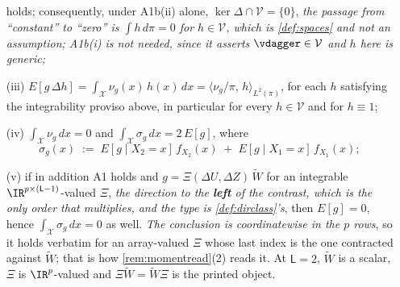 \begin{lemma}
\begin{enumerate}
holds; consequently, under A1b(ii) alone, $\ker\Delta\cap\mathcal V=\{0\}$, \emph{the passage from
``constant'' to ``zero'' is $\int h\,d\pi=0$ for $h\in\mathcal V$, which is \cref{def:spaces} and not an
assumption; A1b(i) is not needed, since it asserts $\vdagger\in\mathcal V$ and $h$ here is generic;}
\item[(iii)] $E[g\,\Delta h]=\int_{\mathcal X}\nu_g(x)\,h(x)\,dx=\langle\nu_g/\pi,\,h\rangle_{L^{2}(\pi)}$,
for each $h$ satisfying the integrability proviso above, in particular for every $h\in\mathcal V$ and
for $h\equiv1$;
\item[(iv)] $\int_{\mathcal X}\nu_g\,dx=0$ and $\int_{\mathcal X}\sigma_g\,dx=2\,E[g]$, where
\begin{equation}\label{eq:sigmadef}
\sigma_g(x)\;:=\;E[g\mid X_2=x]\,f_{X_2}(x)\;+\;E[g\mid X_1=x]\,f_{X_1}(x);
\end{equation}
\item[(v)] if in addition A1 holds and $g=\Xi(\Delta U,\Delta Z)\,\widetilde W$ for an integrable
$\IR^{p\times(\mathsf L-1)}$-valued $\Xi$, \emph{the direction to the \textbf{left} of the contrast,
which is the only order that multiplies, and the type is \cref{def:dirclass}'s}, then $E[g]=0$, hence
$\int_{\mathcal X}\sigma_g\,dx=0$ as well. \emph{The conclusion is coordinatewise in the $p$ rows}, so it
holds verbatim for an array-valued $\Xi$ whose last index is the one contracted against $\widetilde W$;
that is how \cref{rem:momentread}\textup{(2)} reads it. At $\mathsf L=2$, $\widetilde W$ is a
scalar, $\Xi$ is $\IR^{p}$-valued and $\Xi\widetilde W=\widetilde W\Xi$ is the printed object.
\end{enumerate}
\end{lemma}

